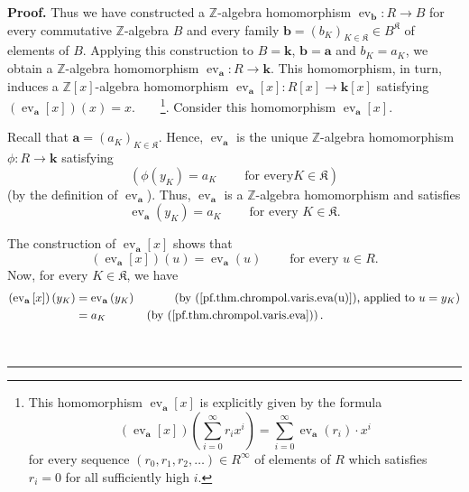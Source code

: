 \documentclass[numbers=enddot,12pt,final,onecolumn,notitlepage]{scrartcl}%
\theoremstyle{definition}
\newenvironment{proof}[1][Proof]{\noindent\textbf{#1.} }{\ \rule{0.5em}{0.5em}}
\newenvironment{verlong}{}{}
\let\sumnonlimits\sum
\renewcommand{\sum}{\sumnonlimits\limits}
\begin{document}
\begin{verlong}
\begin{proof}
Thus we have constructed a $\mathbb{Z}$-algebra homomorphism
$\operatorname*{ev}\nolimits_{\mathbf{b}}:R\rightarrow B$ for every
commutative $\mathbb{Z}$-algebra $B$ and every family $\mathbf{b}=\left(
b_{K}\right)  _{K\in\mathfrak{K}}\in B^{\mathfrak{K}}$ of elements of $B$.
Applying this construction to $B=\mathbf{k}$, $\mathbf{b}=\mathbf{a}$ and
$b_{K}=a_{K}$, we obtain a $\mathbb{Z}$-algebra homomorphism
$\operatorname*{ev}\nolimits_{\mathbf{a}}:R\rightarrow\mathbf{k}$. This
homomorphism, in turn, induces a $\mathbb{Z}\left[  x\right]  $-algebra
homomorphism $\operatorname*{ev}\nolimits_{\mathbf{a}}\left[  x\right]
:R\left[  x\right]  \rightarrow\mathbf{k}\left[  x\right]  $ satisfying
$\left(  \operatorname*{ev}\nolimits_{\mathbf{a}}\left[  x\right]  \right)
\left(  x\right)  =x$.\ \ \ \ \footnote{This homomorphism $\operatorname*{ev}%
\nolimits_{\mathbf{a}}\left[  x\right]  $ is explicitly given by the formula%
\[
\left(  \operatorname*{ev}\nolimits_{\mathbf{a}}\left[  x\right]  \right)
\left(  \sum_{i=0}^{\infty}r_{i}x^{i}\right)  =\sum_{i=0}^{\infty
}\operatorname*{ev}\nolimits_{\mathbf{a}}\left(  r_{i}\right)  \cdot x^{i}%
\]
for every sequence $\left(  r_{0},r_{1},r_{2},\ldots\right)  \in R^{\infty}$
of elements of $R$ which satisfies $r_{i}=0$ for all sufficiently high $i$.}.
Consider this homomorphism $\operatorname*{ev}\nolimits_{\mathbf{a}}\left[
x\right]  $.

Recall that $\mathbf{a}=\left(  a_{K}\right)  _{K\in\mathfrak{K}}$. Hence,
$\operatorname*{ev}\nolimits_{\mathbf{a}}$ is the unique $\mathbb{Z}$-algebra
homomorphism $\phi:R\rightarrow\mathbf{k}$ satisfying%
\[
\left(  \phi\left(  y_{K}\right)  =a_{K}\ \ \ \ \ \ \ \ \ \ \text{for every
}K\in\mathfrak{K}\right)
\]
(by the definition of $\operatorname*{ev}\nolimits_{\mathbf{a}}$). Thus,
$\operatorname*{ev}\nolimits_{\mathbf{a}}$ is a $\mathbb{Z}$-algebra
homomorphism and satisfies%
\begin{equation}
\operatorname*{ev}\nolimits_{\mathbf{a}}\left(  y_{K}\right)  =a_{K}%
\ \ \ \ \ \ \ \ \ \ \text{for every }K\in\mathfrak{K}.
\label{pf.thm.chrompol.varis.eva}%
\end{equation}


The construction of $\operatorname*{ev}\nolimits_{\mathbf{a}}\left[  x\right]
$ shows that
\begin{equation}
\left(  \operatorname*{ev}\nolimits_{\mathbf{a}}\left[  x\right]  \right)
\left(  u\right)  =\operatorname*{ev}\nolimits_{\mathbf{a}}\left(  u\right)
\ \ \ \ \ \ \ \ \ \ \text{for every }u\in R.
\label{pf.thm.chrompol.varis.eva(u)}%
\end{equation}
Now, for every $K\in\mathfrak{K}$, we have%
\begin{align}
\left(  \operatorname*{ev}\nolimits_{\mathbf{a}}\left[  x\right]  \right)
\left(  y_{K}\right)   &  =\operatorname*{ev}\nolimits_{\mathbf{a}}\left(
y_{K}\right)  \ \ \ \ \ \ \ \ \ \ \left(  \text{by
(\ref{pf.thm.chrompol.varis.eva(u)}), applied to }u=y_{K}\right) \nonumber\\
&  =a_{K}\ \ \ \ \ \ \ \ \ \ \left(  \text{by (\ref{pf.thm.chrompol.varis.eva}%
)}\right)  . \label{pf.thm.chrompol.varis.evax}%
\end{align}



\end{proof}
\end{verlong}
\end{document}
